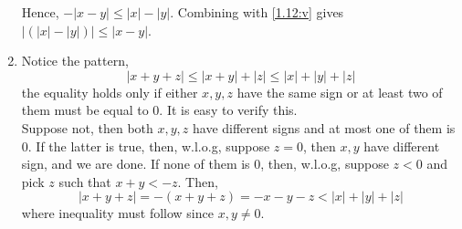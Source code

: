 \begin{solution}
\begin{enumerate}[label=(\roman*)]
    Hence, $-|x-y|\leq|x|-|y|$. Combining with \ref{1.12:v}
    gives $|(|x|-|y|)|\leq|x-y|$.
    \item Notice the pattern,
    \begin{equation*}
      |x+y+z|\leq|x+y|+|z|\leq|x|+|y|+|z|
    \end{equation*}
    the equality holds only if either $x,y,z$ have the same
    sign or at least two of them must be equal to $0$.
    It is easy to verify this.\\
    Suppose not, then both $x,y,z$ have different signs and
    at most one of them is $0$. If the latter is true,
    then, w.l.o.g, suppose $z=0$, then $x,y$ have different
    sign, and we are done. If none of them is $0$, then,
    w.l.o.g, suppose $z<0$ and pick $z$ such that
    $x+y<-z$. Then,
    \begin{equation*}
      |x+y+z|=-(x+y+z)=-x-y-z<|x|+|y|+|z|
    \end{equation*}
    where inequality must follow since $x,y\neq0$.
  \end{enumerate}
\end{solution}

